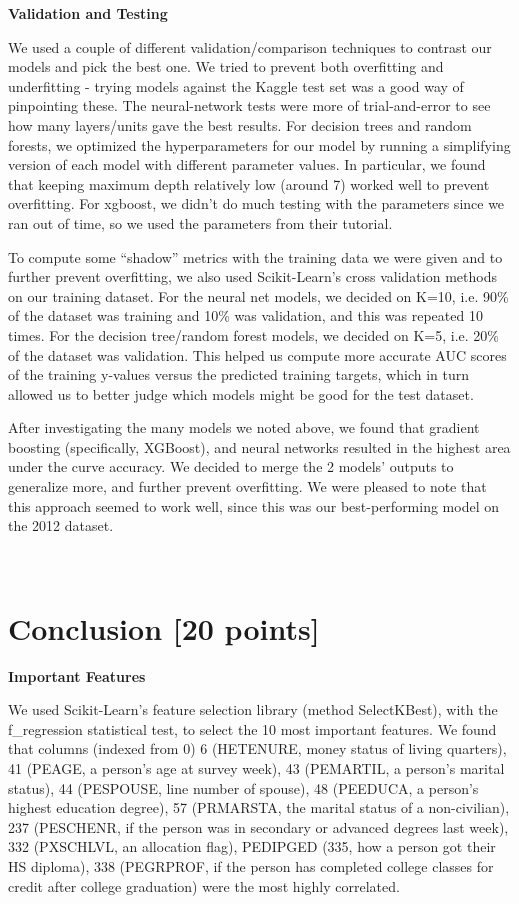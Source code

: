 \vspace{1ex}
\noindent
\textbf{Validation and Testing}

\noindent
We used a couple of different validation/comparison techniques to contrast our models and pick the best one. We tried to prevent both overfitting and underfitting - trying models against the Kaggle test set was a good way of pinpointing these. The neural-network tests were more of trial-and-error to see how many layers/units gave the best results. For decision trees and random forests, we optimized the hyperparameters for our model by running a simplifying version of  each model with different parameter values. In particular, we found that keeping maximum depth relatively low (around 7) worked well to prevent overfitting. For xgboost, we didn’t do much testing with the parameters since we ran out of time, so we used the parameters from their tutorial.

\noindent
To compute some “shadow” metrics with the training data we were given and to further prevent overfitting, we also used Scikit-Learn’s cross validation methods on our training dataset. For the neural net models, we decided on K=10, i.e. 90\% of the dataset was training and 10\% was validation, and this was repeated 10 times. For the decision tree/random forest models, we decided on K=5, i.e. 20\% of the dataset was validation. This helped us compute more accurate AUC scores of the training y-values versus the predicted training targets, which in turn allowed us to better judge which models might be good for the test dataset.

\noindent
After investigating the many models we noted above, we found that gradient boosting (specifically, XGBoost), and neural networks resulted in the highest area under the curve accuracy. We decided to merge the 2 models’ outputs  to generalize more, and further prevent overfitting. We were pleased to note that this approach seemed to work well, since this was our best-performing model on the 2012 dataset.

\newpage~
\newpage

\section{Conclusion [20 points]}

\vspace{2ex}

\noindent
\textbf{Important Features}

\noindent
We used Scikit-Learn’s feature selection library (method SelectKBest), with the f_regression statistical test, to select the 10 most important features. We found that columns (indexed from 0) 6 (HETENURE, money status of living quarters), 41 (PEAGE, a person’s age at survey week), 43 (PEMARTIL, a person’s marital status), 44 (PESPOUSE, line number of spouse), 48 (PEEDUCA, a person’s highest education degree), 57 (PRMARSTA, the marital status of a non-civilian), 237 (PESCHENR, if the person was in secondary or advanced degrees last week), 332 (PXSCHLVL, an allocation flag), PEDIPGED (335, how a person got their HS diploma), 338 (PEGRPROF, if the person has completed college classes for credit after college graduation) were the most highly correlated.

